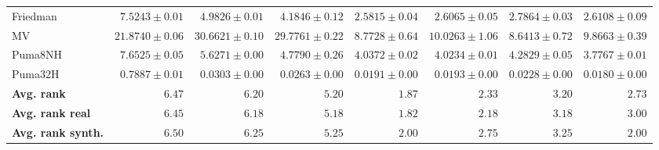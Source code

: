 \begin{table*}[!htbp]
{\begin{tabular}{lrrrrrrr}
		Friedman & $7.5243 \pm 0.01$ & $4.9826 \pm 0.01$ & $4.1846 \pm 0.12$ & $\mathbf{2.5815 \pm 0.04}$ & $2.6065 \pm 0.05$ & $2.7864 \pm 0.03$ & $2.6108 \pm 0.09$\\
		MV & $21.8740 \pm 0.06$ & $30.6621 \pm 0.10$ & $29.7761 \pm 0.22$ & $8.7728 \pm 0.64$ & $10.0263 \pm 1.06$ & $\mathbf{8.6413 \pm 0.72}$ & $9.8663 \pm 0.39$\\
		Puma8NH & $7.6525 \pm 0.05$ & $5.6271 \pm 0.00$ & $4.7790 \pm 0.26$ & $4.0372 \pm 0.02$ & $4.0234 \pm 0.01$ & $4.2829 \pm 0.05$ & $\mathbf{3.7767 \pm 0.01}$\\
		Puma32H & $0.7887 \pm 0.01$ & $0.0303 \pm 0.00$ & $0.0263 \pm 0.00$ & $0.0191 \pm 0.00$ & $0.0193 \pm 0.00$ & $0.0228 \pm 0.00$ & $\mathbf{0.0180 \pm 0.00}$\\
		\midrule
		\textbf{{Avg. rank}} & $6.47$ & $6.20$ & $5.20$ & $\mathbf{1.87}$ & $2.33$ & $3.20$ & $2.73$\\
		\textbf{{Avg. rank real}} & $6.45$ & $6.18$ & $5.18$ & $\mathbf{1.82}$ & $2.18$ & $3.18$ & $3.00$\\
		\textbf{{Avg. rank synth.}} & $6.50$ & $6.25$ & $5.25$ & $\mathbf{2.00}$ & $2.75$ & $3.25$ & $\mathbf{2.00}$\\
		\bottomrule
	\end{tabular}}
\end{table*}
